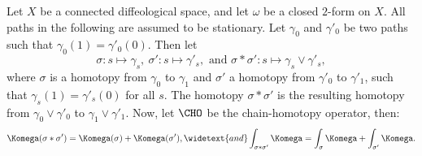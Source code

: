 \begin{article}
  \label{art:Integrating Concatenations over Homotopies}
  Let $X$ be a connected diffeological space,
  and let $\omega$ be a closed $2$-form on $X$.
  All paths in the following are assumed to be stationary.
  Let $\gamma_0$ and $\gamma'_0$ be two paths such that $\gamma_0(1) = \gamma'_0(0)$.
  Then let
  $$
    \sigma : s \mapsto \gamma_s, \
    \sigma' : s \mapsto \gamma'_s,
    \text{ and } \sigma*\sigma' : s \mapsto \gamma_s \vee \gamma'_s,
    $$
  where $\sigma$ is a homotopy from $\gamma_0$ to $\gamma_1$ and $\sigma'$ a homotopy from $\gamma'_0$ to $\gamma'_1$,
  such that $\gamma_s(1) = \gamma'_s(0)$ for all $s$.
  The homotopy $\sigma*\sigma'$ is the resulting homotopy from $\gamma_0 \vee \gamma'_0$ to $\gamma_1 \vee \gamma'_1$.
  Now,
  let $\CHO$ be the chain-homotopy operator,
  then:
  $$
    \Komega(\sigma * \sigma') = \Komega(\sigma) + \Komega(\sigma'),
    \widetext{and}
    \int_{\sigma * \sigma'} \Komega = \int_\sigma \Komega + \int_{\sigma'} \Komega.
    $$
\end{article} %

